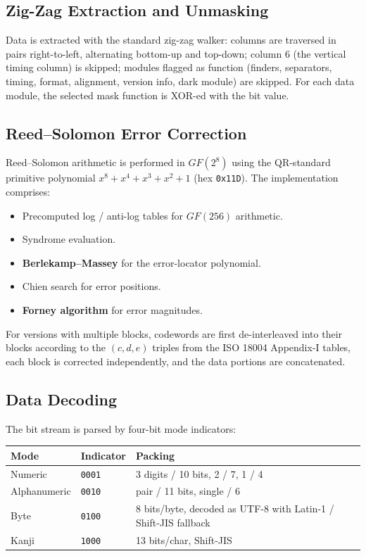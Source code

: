 \documentclass[11pt,a4paper]{article}
\begin{document}
\subsection{Zig-Zag Extraction and Unmasking}

Data is extracted with the standard zig-zag walker: columns are
traversed in pairs right-to-left, alternating bottom-up and top-down;
column 6 (the vertical timing column) is skipped; modules flagged as
function (finders, separators, timing, format, alignment, version
info, dark module) are skipped. For each data module, the selected
mask function is XOR-ed with the bit value.

\subsection{Reed--Solomon Error Correction}

Reed--Solomon arithmetic is performed in $GF(2^8)$ using the QR-standard primitive polynomial $x^8 + x^4 + x^3 + x^2 + 1$ (hex \texttt{0x11D}). The implementation comprises:

\begin{itemize}[leftmargin=1.4em, itemsep=0.2em]
  \item Precomputed log / anti-log tables for $GF(256)$ arithmetic.
  \item Syndrome evaluation.
  \item \textbf{Berlekamp--Massey} for the error-locator polynomial.
  \item Chien search for error positions.
  \item \textbf{Forney algorithm} for error magnitudes.
\end{itemize}

For versions with multiple blocks, codewords are first de-interleaved
into their blocks according to the $(c, d, e)$ triples from the ISO
18004 Appendix-I tables, each block is corrected independently, and
the data portions are concatenated.

\subsection{Data Decoding}

The bit stream is parsed by four-bit mode indicators:

\begin{center}
\begin{tabular}{@{}lll@{}}
\toprule
Mode & Indicator & Packing \\
\midrule
Numeric      & \texttt{0001} & 3 digits / 10 bits, 2 / 7, 1 / 4 \\
Alphanumeric & \texttt{0010} & pair / 11 bits, single / 6 \\
Byte         & \texttt{0100} & 8 bits/byte, decoded as UTF-8 with
                                 Latin-1 / Shift-JIS fallback \\
Kanji        & \texttt{1000} & 13 bits/char, Shift-JIS \\
\bottomrule
\end{tabular}
\end{center}
\end{document}
